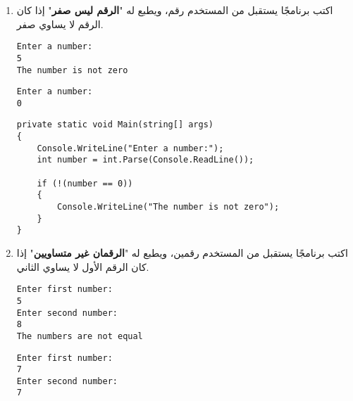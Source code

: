 \documentclass[12pt, twoside]{article}
\begin{document}
\begin{enumerate}[itemsep=3em]
\begin{enumerate}
\item
اكتب برنامجًا يستقبل من المستخدم رقم، ويطبع له "\textbf{الرقم ليس صفر}" إذا كان الرقم لا يساوي صفر.
\ifdetailed
\begin{boxExample}[1]
\begin{english}
\begin{verbatim}
Enter a number:
5
The number is not zero
\end{verbatim}
\end{english}
\end{boxExample}
\begin{boxExample}[2]
\begin{english}
\begin{verbatim}
Enter a number:
0
\end{verbatim}
\end{english}
\end{boxExample}

\ifwithsols
\begin{boxSolution}
\begin{english}
\begin{verbatim}
private static void Main(string[] args)
{
    Console.WriteLine("Enter a number:");
    int number = int.Parse(Console.ReadLine());

    if (!(number == 0))
    {
        Console.WriteLine("The number is not zero");
    }
}
\end{verbatim}
\end{english}
\end{boxSolution}
\clearpage
\fi
\fi

\item
اكتب برنامجًا يستقبل من المستخدم رقمين، ويطبع له "\textbf{الرقمان غير متساويين}" إذا كان الرقم الأول لا يساوي الثاني.
\ifdetailed
\begin{boxExample}[1]
\begin{english}
\begin{verbatim}
Enter first number:
5
Enter second number:
8
The numbers are not equal
\end{verbatim}
\end{english}
\end{boxExample}
\begin{boxExample}[2]
\begin{english}
\begin{verbatim}
Enter first number:
7
Enter second number:
7
\end{verbatim}
\end{english}
\end{boxExample}


\end{enumerate}
\end{enumerate}
\end{document}
